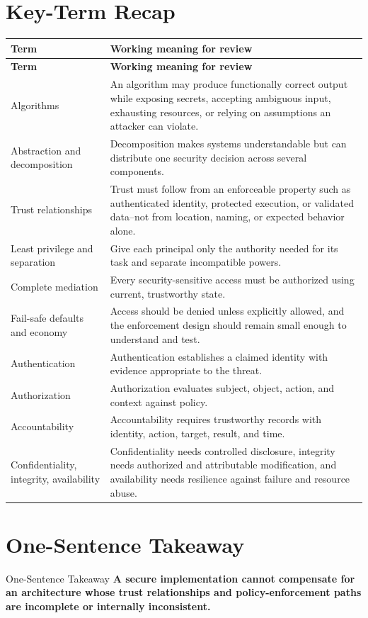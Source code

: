 \documentclass[11pt,letterpaper]{article}
\begin{document}
\section{Key-Term Recap}
\begin{longtable}{>{\raggedright\arraybackslash}p{}p{}}
\toprule
\textbf{Term} & \textbf{Working meaning for review} \\
\midrule
\endfirsthead
\toprule
\textbf{Term} & \textbf{Working meaning for review} \\
\midrule
\endhead
Algorithms & An algorithm may produce functionally correct output while exposing secrets, accepting ambiguous input, exhausting resources, or relying on assumptions an attacker can violate. \\
Abstraction and decomposition & Decomposition makes systems understandable but can distribute one security decision across several components. \\
Trust relationships & Trust must follow from an enforceable property such as authenticated identity, protected execution, or validated data--not from location, naming, or expected behavior alone. \\
Least privilege and separation & Give each principal only the authority needed for its task and separate incompatible powers. \\
Complete mediation & Every security-sensitive access must be authorized using current, trustworthy state. \\
Fail-safe defaults and economy & Access should be denied unless explicitly allowed, and the enforcement design should remain small enough to understand and test. \\
Authentication & Authentication establishes a claimed identity with evidence appropriate to the threat. \\
Authorization & Authorization evaluates subject, object, action, and context against policy. \\
Accountability & Accountability requires trustworthy records with identity, action, target, result, and time. \\
Confidentiality, integrity, availability & Confidentiality needs controlled disclosure, integrity needs authorized and attributable modification, and availability needs resilience against failure and resource abuse. \\
\bottomrule
\end{longtable}
\section{One-Sentence Takeaway}
\begin{CornellExamBox}{One-Sentence Takeaway}
\textbf{A secure implementation cannot compensate for an architecture whose trust relationships and policy-enforcement paths are incomplete or internally inconsistent.}
\end{CornellExamBox}
\end{document}
